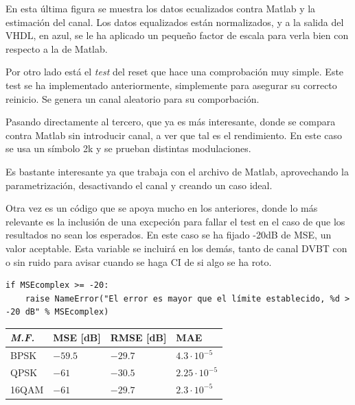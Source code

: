 \documentclass[11pt]{scrartcl} %
\begin{document}
\begin{preview}
En esta última figura se muestra los datos ecualizados contra Matlab y la estimación del canal. Los datos equalizados están normalizados, y a la salida del VHDL, en azul, se le ha aplicado un pequeño factor de escala para verla bien con respecto a la de Matlab.

Por otro lado está el \emph{test} del reset que hace una comprobación muy simple. Este test se ha implementado anteriormente, simplemente para asegurar su correcto reinicio. Se genera un canal aleatorio para su comporbación.

Pasando directamente al tercero, que ya es más interesante, donde se compara contra Matlab sin introducir canal, a ver que tal es el rendimiento. En este caso se usa un símbolo 2k y se prueban distintas modulaciones. 

Es bastante interesante ya que trabaja con el archivo de Matlab, aprovechando la parametrización, desactivando el canal y creando un caso ideal.

Otra vez es un código que se apoya mucho en los anteriores, donde lo más relevante es la inclusión de una excpeción para fallar el test en el caso de que los resultados no sean los esperados. En este caso se ha fijado -20dB de MSE, un valor aceptable. Esta variable se incluirá en los demás, tanto de canal DVBT con o sin ruido para avisar cuando se haga CI de si algo se ha roto.

\begin{verbatim}
if MSEcomplex >= -20:
	raise NameError("El error es mayor que el límite establecido, %d > -20 dB" % MSEcomplex)
\end{verbatim}

\vspace{5mm}
\begin{minipage}{\linewidth}
	\begin{center}
	\centering %
		\begin{tabular}{l l l l}
		\toprule
		\textit{M.F.} & \textbf{MSE [dB]} & \textbf{RMSE [dB]} & \textbf{MAE}\\
		\midrule
		BPSK & $-59.5$ &  $-29.7$ & $4.3 \cdot 10^{-5}$ \\
		QPSK & $-61$ &  $-30.5$ & $2.25 \cdot 10^{-5}$ \\
		16QAM & $-61$ &  $-29.7$ & $2.3 \cdot 10^{-5}$ \\
		\bottomrule
	\end{tabular}
	\end{center}
\end{minipage}


\end{preview}
\end{document}
